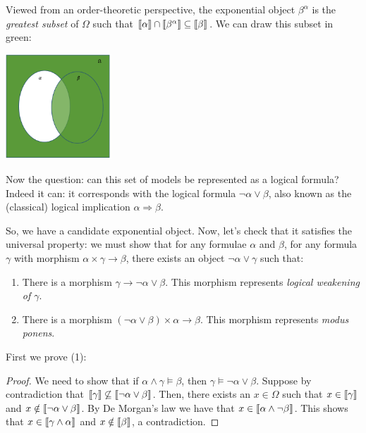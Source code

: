 Viewed from an order-theoretic perspective, the exponential object
$\beta^\alpha$ is the \emph{greatest subset} of $\Omega$ such that
$\left\llbracket \alpha \right\rrbracket \cap \left\llbracket \beta^\alpha \right\rrbracket \subseteq \left\llbracket \beta \right\rrbracket$. 
We can draw this subset in green:
\begin{center} \label{pic:venn-impl}
  \includegraphics[width=150px]{fig/venn-impl.png}
\end{center}

Now the question: can
this set of models be represented as a logical formula? Indeed it can:
it corresponds with the logical formula $\neg \alpha \lor \beta$, 
also known as the (classical) logical implication $\alpha \Rightarrow \beta$.

So, we have a candidate exponential object. Now, let's check that it 
satisfies the universal property: we 
must show that for any formulae $\alpha$ and $\beta$, 
for any formula $\gamma$ with morphism $\alpha \times \gamma \to \beta$, 
there exists an object $\neg \alpha \lor \gamma$ such that:
\begin{enumerate}
  \item There is a morphism $\gamma \to \neg \alpha \lor \beta$. This morphism represents \emph{logical weakening of $\gamma$}.
  \item There is a morphism $(\neg \alpha \lor \beta) \times \alpha \to \beta$. 
  This morphism represents \emph{modus ponens}.
\end{enumerate}
First we prove (1):
\begin{proof}
  We need to show that if $\alpha \land \gamma \models \beta$, then 
  $\gamma \models \neg \alpha \lor \beta$.
  Suppose by contradiction that $\left\llbracket \gamma \right\rrbracket \not\subseteq \left\llbracket \neg \alpha \lor \beta \right\rrbracket$.
  Then, there exists an $x \in \Omega$ such that $x \in \left\llbracket \gamma \right\rrbracket$
  and $x \notin \left\llbracket \neg \alpha \lor \beta \right\rrbracket$. 
  By De Morgan's law we have that $x \in \left\llbracket \alpha \land \neg \beta \right\rrbracket$. 
  This shows that $x \in \left\llbracket \gamma \land \alpha \right\rrbracket$ and $x \notin \left\llbracket \beta \right\rrbracket$, 
  a contradiction.
\end{proof}

